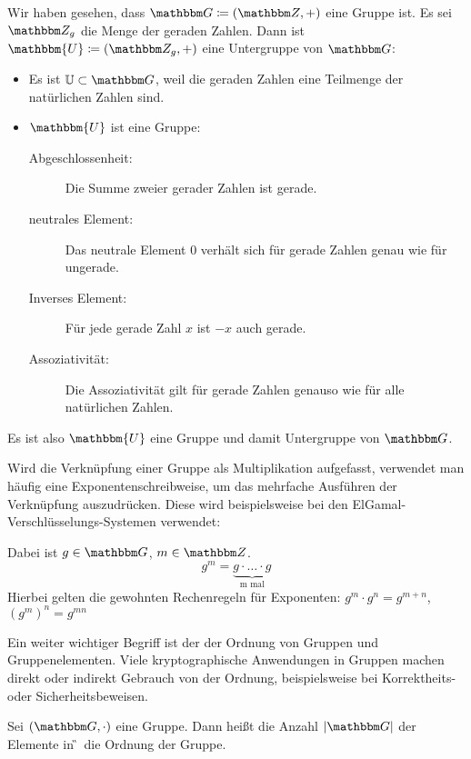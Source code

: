 \begin{beispiel}
  Wir haben gesehen, dass $\G \coloneqq (\Z{}, +)$ eine Gruppe ist. Es sei
  $\Z{g}$ die Menge der geraden Zahlen. Dann ist $\mathbbm{U} \coloneqq (\Z{g},
  +)$ eine Untergruppe von $\G$:
  \begin{itemize}
  \item Es ist $\mathbb{U} \subset \G$, weil die geraden Zahlen eine
     Teilmenge der natürlichen Zahlen sind.
  \item $\mathbbm{U}$ ist eine Gruppe:
    \begin{description}
    \item[Abgeschlossenheit:] Die Summe zweier gerader Zahlen ist gerade.
    \item[neutrales Element:] Das neutrale Element $0$ verhält sich für
      gerade Zahlen genau wie für ungerade.
    \item[Inverses Element:] Für jede gerade Zahl $x$ ist $-x$ auch
      gerade.
    \item[Assoziativität:] Die Assoziativität gilt für gerade Zahlen
      genauso wie für alle natürlichen Zahlen.
    \end{description}
  \end{itemize}
  Es ist also $\mathbbm{U}$ eine Gruppe und damit Untergruppe von $\G$.
\end{beispiel}

Wird die Verknüpfung einer Gruppe als Multiplikation aufgefasst,
verwendet man häufig eine Exponentenschreibweise, um das mehrfache
Ausführen der Verknüpfung auszudrücken. Diese wird beispielsweise bei den
ElGamal-Verschlüsselungs-Systemen verwendet:

\begin{definition}
 Dabei ist $g\in \G$, $m \in \Z{}$.
\[ g^m = \underbrace{g \cdot \dotsc \cdot g}_{\text{m mal}} \]
Hierbei gelten die gewohnten Rechenregeln für Exponenten: $g^m\cdot g^n =
g^{m+n}$, $(g^m)^n = g^{mn}$
\end{definition}
Ein weiter wichtiger Begriff ist der der Ordnung von Gruppen und
Gruppenelementen. Viele kryptographische Anwendungen in Gruppen machen
direkt oder indirekt Gebrauch von der Ordnung, beispielsweise bei
Korrektheits- oder Sicherheitsbeweisen. 
\begin{definition}
  Sei $(\G, \cdot)$ eine Gruppe. Dann heißt die Anzahl $|\G|$ der Elemente in
  \G~die Ordnung der Gruppe.
\end{definition}

